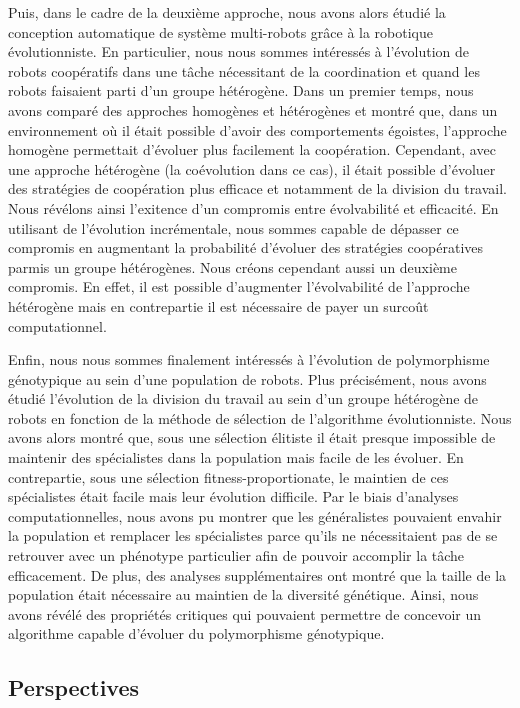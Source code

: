 		Puis, dans le cadre de la deuxième approche, nous avons alors étudié la conception automatique de système multi-robots grâce à la robotique évolutionniste. En particulier, nous nous sommes intéressés à l'évolution de robots coopératifs dans une tâche nécessitant de la coordination et quand les robots faisaient parti d'un groupe hétérogène. Dans un premier temps, nous avons comparé des approches homogènes et hétérogènes et montré que, dans un environnement où il était possible d'avoir des comportements égoistes, l'approche homogène permettait d'évoluer plus facilement la coopération. Cependant, avec une approche hétérogène (la coévolution dans ce cas), il était possible d'évoluer des stratégies de coopération plus efficace et notamment de la division du travail. Nous révélons ainsi l'exitence d'un compromis entre évolvabilité et efficacité. En utilisant de l'évolution incrémentale, nous sommes capable de dépasser ce compromis en augmentant la probabilité d'évoluer des stratégies coopératives parmis un groupe hétérogènes. Nous créons cependant aussi un deuxième compromis. En effet, il est possible d'augmenter l'évolvabilité de l'approche hétérogène mais en contrepartie il est nécessaire de payer un surcoût computationnel.

		Enfin, nous nous sommes finalement intéressés à l'évolution de polymorphisme génotypique au sein d'une population de robots. Plus précisément, nous avons étudié l'évolution de la division du travail au sein d'un groupe hétérogène de robots en fonction de la méthode de sélection de l'algorithme évolutionniste. Nous avons alors montré que, sous une sélection élitiste il était presque impossible de maintenir des spécialistes dans la population mais facile de les évoluer. En contrepartie, sous une sélection fitness-proportionate, le maintien de ces spécialistes était facile mais leur évolution difficile. Par le biais d'analyses computationnelles, nous avons pu montrer que les généralistes pouvaient envahir la population et remplacer les spécialistes parce qu'ils ne nécessitaient pas de se retrouver avec un phénotype particulier afin de pouvoir accomplir la tâche efficacement. De plus, des analyses supplémentaires ont montré que la taille de la population était nécessaire au maintien de la diversité génétique. Ainsi, nous avons révélé des propriétés critiques qui pouvaient permettre de concevoir un algorithme capable d'évoluer du polymorphisme génotypique.


	\subsection{Perspectives}

